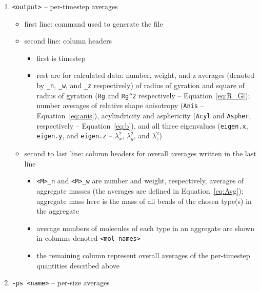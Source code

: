 \begin{enumerate}[nosep,leftmargin=20pt]
  \item \texttt{<output>} -- per-timestep averages
    \begin{itemize}[nosep,leftmargin=5pt]
      \item first line: command used to generate the file
      \item second line: column headers
        \begin{itemize}[nosep,leftmargin=10pt]
          \item first is timestep
          \item rest are for calculated data: number, weight, and z
            averages (denoted by \texttt{\_n}, \texttt{\_w},
            and \texttt{\_z} respectively) of radius of gyration and square
            of radius of gyration
            (\texttt{Rg} and \texttt{Rg\^{}2} respectively --
            Equation~\eqref{eq:R_G}); number averages of relative shape anisotropy
            (\texttt{Anis} -- Equation~\eqref{eq:anis}), acylindricity
            and asphericity (\texttt{Acyl} and \texttt{Aspher},
            respectively -- Equation~\eqref{eq:b}), and all three
            eigenvalues (\texttt{eigen.x}, \texttt{eigen.y}, and
            \texttt{eigen.z} -- $\lambda_x^2$, $\lambda_y^2$, and
            $\lambda_z^2$)
        \end{itemize}
      \item second to last line: column headers for overall averages
        written in the last line
        \begin{itemize}[nosep,leftmargin=10pt]
          \item \texttt{<M>\_n} and \texttt{<M>\_w} are
            number and weight, respectively, averages of aggregate
            masses (the averages are defined in Equation~\eqref{eq:Avg});
            aggregate mass here is the mass of all beads of the chosen
            type(s) in the aggregate
          \item average numbers of molecules of each type in an aggregate
            are shown in columns denoted \texttt{<mol names>}
          \item the remaining column represent overall averages of the
            per-timestep quantities described above
        \end{itemize}
    \end{itemize}
  \item \texttt{-ps <name>} -- per-size averages
  \begin{itemize}[nosep,leftmargin=5pt]

\end{itemize}
\end{enumerate}
